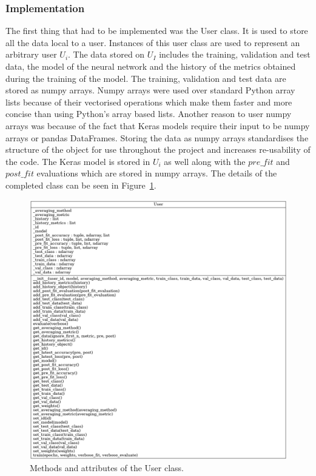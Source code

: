 \documentclass[12pt]{article}
\begin{document}
\subsubsection{Implementation}
The first thing that had to be implemented was the User class. It is used to store all the data local to a user. Instances of this user class are used to represent an arbitrary user $U_i$. The data stored on $U_I$ includes the training, validation and test data, the model of the neural network and the history of the metrics obtained during the training of the model. The training, validation and test data are stored as numpy arrays. Numpy arrays were used over standard Python array lists because of their vectorised operations which make them faster and more concise than using Python's array based lists. Another reason to user numpy arrays was because of the fact that Keras models require their input to be numpy arrays or pandas DataFrames. Storing the data as numpy arrays standardises the structure of the object for use throughout the project and increases re-usability of the code. The Keras model is stored in $U_i$ as well along with the $pre\_fit$ and $post\_fit$ evaluations which are stored in numpy arrays. The details of the completed class can be seen in Figure~\ref{fig:classes_user}. 
\begin{figure}[H]
	\centering
	\includegraphics[width=\linewidth]{resources/classes_User.png}
	\caption{Methods and attributes of the User class.}
	\label{fig:classes_user}
\end{figure}
\end{document}
